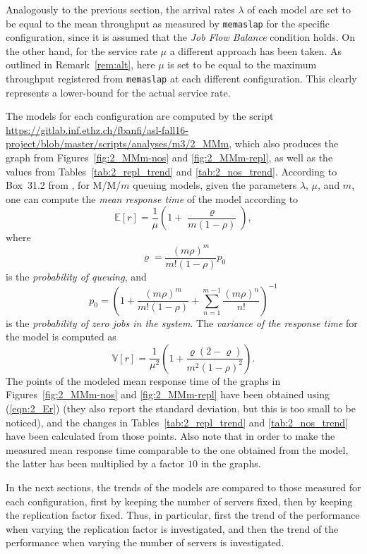 \documentclass[11pt]{article}
\theoremstyle{definition}
\newcommand\E[1]{\mathbb E[#1]}
\newcommand\V[1]{\mathbb V[#1]}
\renewcommand\t\texttt
\begin{document}
Analogously to the previous section, the arrival rates $\lambda$ of each model are set to be equal to the mean throughput as measured by \t{memaslap} for the specific configuration, since it is assumed that the \emph{Job Flow Balance} condition holds.
On the other hand, for the service rate $\mu$ a different approach has been taken.
As outlined in Remark~\ref{rem:alt}, here $\mu$ is set to be equal to the maximum throughput registered from \t{memaslap} at each different configuration.
This clearly represents a lower-bound for the actual service rate.

The models for each configuration are computed by the script \url{https://gitlab.inf.ethz.ch/fbanfi/asl-fall16-project/blob/master/scripts/analyses/m3/2_MMm}, which also produces the graph from Figures~\ref{fig:2_MMm-nos} and \ref{fig:2_MMm-repl}, as well as the values from Tables~\ref{tab:2_repl_trend} and \ref{tab:2_nos_trend}.
According to Box~31.2 from \cite{jain91}, for M/M/$m$ queuing models, given the parameters $\lambda$, $\mu$, and $m$, one can compute the \emph{mean response time} of the model according to
\begin{equation}
\label{eqn:2_Er}
\E r=\frac1\mu\left(1+\frac\varrho{m(1-\rho)}\right),
\end{equation}
where 
\[\varrho=\frac{(m\rho)^m}{m!(1-\rho)}p_0\]
is the \emph{probability of queuing}, and
\[p_0=\left(1+\frac{(m\rho)^m}{m!(1-\rho)}+\sum_{n=1}^{m-1}\frac{(m\rho)^n}{n!}\right)^{-1}\]
is the \emph{probability of zero jobs in the system}.
The \emph{variance of the response time} for the model is computed as
\[\V r=\frac1{\mu^2}\left(1+\frac{\varrho(2-\varrho)}{m^2(1-\rho)^2}\right).\]
The points of the modeled mean response time of the graphs in Figures~\ref{fig:2_MMm-nos} and \ref{fig:2_MMm-repl} have been obtained using (\ref{eqn:2_Er}) (they also report the standard deviation, but this is too small to be noticed), and the changes in Tables~\ref{tab:2_repl_trend} and \ref{tab:2_nos_trend} have been calculated from those points.
Also note that in order to make the measured mean response time comparable to the one obtained from the model, the latter has been multiplied by a factor $10$ in the graphs.


In the next sections, the trends of the models are compared to those measured for each configuration, first by keeping the number of servers fixed, then by keeping the replication factor fixed.
Thus, in particular, first the trend of the performance when varying the replication factor is investigated, and then the trend of the performance when varying the number of servers is investigated.
\end{document}
